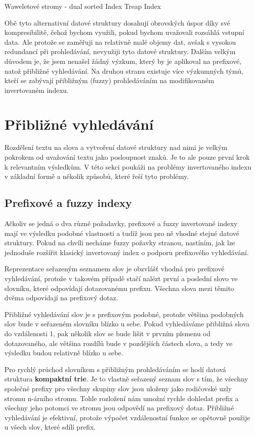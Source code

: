 \documentclass[12pt]{article}
\begin{document}
Waweletové stromy - dual sorted Index Treap Index

Obě tyto alternativní datové struktury dosahují obrovských úspor díky
své kompresibilitě, čehož bychom využili, pokud bychom uvažovali
rozsáhlá vstupní data. Ale protože se zaměřuji na relativně malé objemy
dat, avšak s vysokou redundancí při prohledávání, nevyužiji tyto datové
struktury. Dalším velkým důvodem je, že jsem nenašel žádný výzkum, který
by je aplikoval na prefixové, natož přibližné vyhledávání. Na druhou
stranu existuje více výzkumných týmů, kteří se zabývají přibližným
(fuzzy) prohledáváním na modifikovaném invertovaném indexu.

\section{Přibližné vyhledávání}
Rozdělení textu na slova a vytvoření datové struktury nad nimi je velkým
pokrokem od uvažování textu jako posloupnost znaků. Je to ale pouze první krok
k relevantním výsledkům. V této sekci poukáži na problémy invertovaného indexu
v základní formě a několik způsobů, které řeší tyto problémy.

\subsection{Prefixové a fuzzy indexy}
Ačkoliv se jedná o dva různé požadavky, prefixové a fuzzy invertované indexy
mají ve výsledku podobné vlastnosti a tudíž jsou pro ně vhodné stejné datové
struktury. Pokud na chvíli necháme fuzzy požavky stranou, nastíním, jak lze
jednoduše rozšířit klasický invertovaný index o podporu prefixového
vyhledávání.

Reprezentace seřazeným seznamem slov je obzvlášť vhodná pro prefixové
vyhledávání, protože v takovém případě stačí nalézt první a poslední slovo ve
slovníku, které odpovídají dotazovanému prefixu. Všechna slova mezi těmito
dvěma odpovídají na prefixový dotaz.

Přibližné vyhledávání slov je s prefixovým podobné, protože většina podobných
slov bude v seřazeném slovníku blízko u sebe. Pokud vyhledáváme přibližná slova
do vzdálenosti 1, pak několik slov se bude lišit v prvním písmenu od
dotazovaného, ale většina rozdílů bude v pozdějších částech slova, a tedy ve
výsledku budou relativně blízko u sebe.

Pro rychlý průchod slovníkem s přibližným prohledáváním se hodí datová
struktura \textbf{kompaktní trie}. Je to vlastně seřazený seznam slov s tím, že
všechny společné prefixy pro všechny skupiny slov jsou uloženy jako rodičovské
uzly stromu n-árního stromu. Tohle rozložení nám umožní rychle dohledat prefix
a všechny jeho potomci ve stromu jsou odpovědí na prefixový dotaz. Přibližné
vyhledávání je efektivní, protože výpočet vzdálenostní funkce se opětovně
použije u všech slov, které sdílí prefix.
\end{document}
